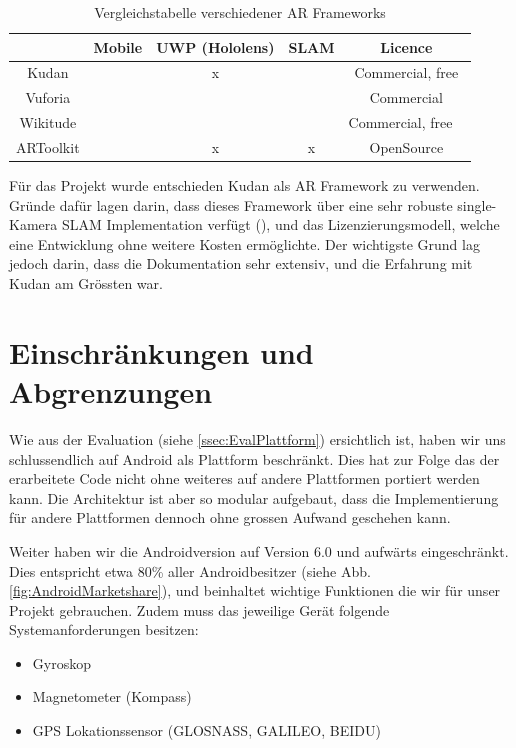 \documentclass[a4paper]{scrreprt}
\begin{document}
\begin{table}[h!]
	\center
	\begin{tabular}{|c|c|c|c|c|}
		\hline 
		& \textbf{Mobile} & \textbf{UWP (Hololens)} & \textbf{SLAM} & \textbf{Licence} \\ 
		\hline 
		Kudan & \checkmark & x & \checkmark & Commercial, free \\ 
		\hline 
		Vuforia & \checkmark & \checkmark & \checkmark & Commercial \\ 
		\hline 
		Wikitude & \checkmark & \checkmark & \checkmark & Commercial, free \ \\ 
		\hline 
		ARToolkit & \checkmark & x & x & OpenSource \\ 
		\hline 
	\end{tabular}
	\caption{Vergleichstabelle verschiedener AR Frameworks}
\end{table}


Für das Projekt wurde entschieden Kudan als AR Framework zu verwenden. Gründe dafür lagen darin, dass dieses Framework über eine sehr robuste single-Kamera SLAM Implementation verfügt (\cite{BerfinAyhan2017}), und das Lizenzierungsmodell, welche eine Entwicklung ohne weitere Kosten ermöglichte. Der wichtigste Grund lag jedoch darin, dass die Dokumentation sehr extensiv, und die Erfahrung mit Kudan am Grössten war.

\section{Einschränkungen und Abgrenzungen}

Wie aus der Evaluation (siehe \ref{ssec:EvalPlattform}) ersichtlich ist, haben wir uns schlussendlich auf Android als Plattform beschränkt. Dies hat zur Folge das der erarbeitete Code nicht ohne weiteres auf andere Plattformen portiert werden kann. Die Architektur ist aber so modular aufgebaut, dass die Implementierung für andere Plattformen dennoch ohne grossen Aufwand geschehen kann.

Weiter haben wir die Androidversion auf Version 6.0 und aufwärts eingeschränkt. Dies entspricht etwa 80\% aller Androidbesitzer (siehe Abb. \ref{fig:AndroidMarketshare}), und beinhaltet wichtige Funktionen die wir für unser Projekt gebrauchen. Zudem muss das jeweilige Gerät folgende Systemanforderungen besitzen:
\begin{itemize}
	\item Gyroskop
	\item Magnetometer (Kompass)
	\item GPS Lokationssensor (GLOSNASS, GALILEO, BEIDU)
\end{itemize}
\end{document}
